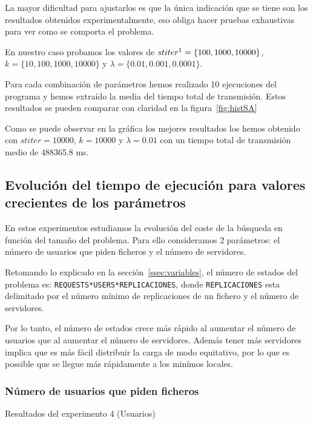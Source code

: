 La mayor dificultad para ajustarlos es que la única indicación que se tiene son los resultados obtenidos experimentalmente, eso obliga hacer pruebas exhaustivas para ver como se comporta el problema.

En nuestro caso probamos los valores de $stiter\footnote{Iteraciones por cada cambio de temperatura}=\{100,1000,10000\}$, $k=\{10,100,1000,10000\}$ y $\lambda=\{0.01,0.001,0.0001\}$. %

Para cada combinación de parámetros hemos realizado 10 ejecuciones del programa y hemos extraído la media del tiempo total de transmisión. Estos resultados se pueden comparar con claridad en la figura~\ref{fig:histSA} %

Como se puede observar en la gráfica los mejores resultados los hemos obtenido con $stiter=10000$, $k=10000$ y $\lambda=0.01$ con un tiempo total de transmisión medio de 488365.8 ms.


\subsection{Evolución del tiempo de ejecución para valores crecientes de los parámetros}

En estos experimentos estudiamos la evolución del coste de la búsqueda en función del tamaño del
problema. Para ello consideramos 2 parámetros: el número de usuarios que piden ficheros y el número
de servidores.

Retomando lo explicado en la sección~\ref{ssec:variables}, el número de estados del problema es:
\texttt{REQUESTS*USERS*REPLICACIONES}, donde \texttt{REPLICACIONES} esta delimitado por
el número mínimo de replicaciones de un fichero y el número de servidores.

Por lo tanto, el número de estados crece más rápido al aumentar el número de usuarios que al aumentar
el número de servidores. Además tener más servidores implica que es más fácil distribuir la carga de modo
equitativo, por lo que es possible que se llegue más rápidamente a los minímos locales.

\subsubsection{Número de usuarios que piden ficheros}


\begin{table}[H]
    \caption{Resultados del experimento 4 (Usuarios)}%
    \label{tab:ex4u}
    \begin{center}
    
    \end{center}
\end{table}

